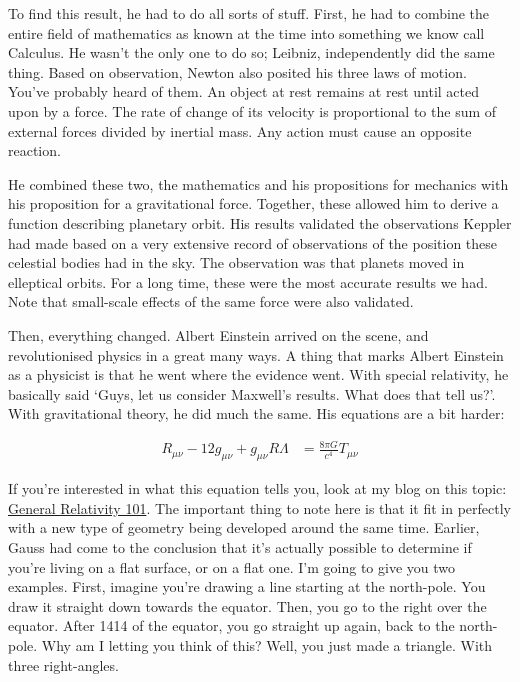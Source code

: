 \begin{multicols}{2}
To find this result, he had to do all sorts of stuff. First, he had to combine the entire field of mathematics as known at the time into something we know call Calculus. He wasn't the only one to do so; Leibniz, independently did the same thing. Based on observation, Newton also posited his three laws of motion. You've probably heard of them. An object at rest remains at rest until acted upon by a force. The rate of change of its velocity is proportional to the sum of external forces divided by inertial mass. Any action must cause an opposite reaction.

He combined these two, the mathematics and his propositions for mechanics with his proposition for a gravitational force. Together, these allowed him to derive a function describing planetary orbit. His results validated the observations Keppler had made based on a very extensive record of observations of the position these celestial bodies had in the sky. The observation was that planets moved in elleptical orbits. For a long time, these were the most accurate results we had. Note that small-scale effects of the same force were also validated.

Then, everything changed. Albert Einstein arrived on the scene, and revolutionised physics in a great many ways. A thing that marks Albert Einstein as a physicist is that he went where the evidence went. With special relativity, he basically said ‘Guys, let us consider Maxwell's results. What does that tell us?’. With gravitational theory, he did much the same. His equations are a bit harder:

\begin{align}
R_{\mu\nu} - 12 g_{\mu\nu} + g_{\mu\nu}R \Lambda &= \frac{8 \pi G}{c^4} T_{\mu\nu}
\end{align} 

If you're interested in what this equation tells you, look at my blog on this topic: \href{http://blog.daimonie.com/2016/04/general-relativity-101.html}{General Relativity 101}. The important thing to note here is that it fit in perfectly with a new type of geometry being developed around the same time. Earlier, Gauss had come to the conclusion that it's actually possible to determine if you're living on a flat surface, or on a flat one. I'm going to give you two examples. First, imagine you're drawing a line starting at the north-pole. You draw it straight down towards the equator. Then, you go to the right over the equator. After 1414 of the equator, you go straight up again, back to the north-pole. Why am I letting you think of this? Well, you just made a triangle. With three right-angles.


\end{multicols}
